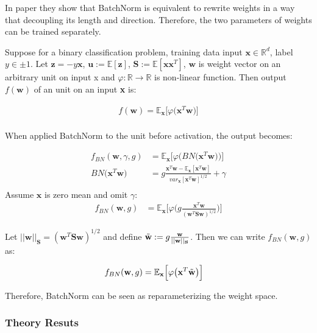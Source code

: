 \documentclass{article}
\begin{document}
In paper \cite{decoupling} they show that BatchNorm is equivalent to rewrite weights in a way that decoupling its length and direction. Therefore, the two parameters of weights can be trained separately.

Suppose for a binary classification problem, training data input $\textbf{x}\in\mathbb{R}^d$, label $y\in{\pm1}$. Let $\textbf{z}=-y\textbf{x}$, $\textbf{u}:=\mathbb{E}[\textbf{z}]$, $\textbf{S}:=\mathbb{E}[\textbf{xx}^T]$, $\textbf{w}$ is weight vector on an arbitrary unit on input x and $\varphi: \mathbb{R}\xrightarrow{}\mathbb{R}$ is non-linear function. Then output $f(\textbf{w})$ of an unit on an input \textbf{x} is:

\begin{align*}
	f(\textbf{w})=\mathbb{E}_{\textbf{x}}\big[\varphi\big(\textbf{x}^T\textbf{w}\big)\big]\\
\end{align*}

When applied BatchNorm to the unit before activation, the output becomes:

\begin{align*}
	f_{BN}(\textbf{w},\gamma,g)&=\mathbb{E}_{\textbf{x}}\big[\varphi\big(BN\big(\textbf{x}^T\textbf{w}\big)\big)\big]\\
	BN\big(\textbf{x}^T\textbf{w}\big)&=g\frac{\textbf{x}^T\textbf{w}-\mathbb{E}_{\textbf{x}}[\textbf{x}^T\textbf{w}]}{var_\textbf{x}[\textbf{x}^T\textbf{w}]^{1/2}}+\gamma\\
\end{align*}
Assume $\textbf{x}$ is zero mean and omit $\gamma$:
\begin{align*}
	f_{BN}(\textbf{w},g)&=\mathbb{E}_{\textbf{x}}\Big[\varphi\Big(g\frac{\textbf{x}^T\textbf{w}}{(\textbf{w}^T\textbf{Sw})^{1/2}}\Big)\Big]
\end{align*}

Let $||\textbf{w}||_{\textbf{S}}=(\textbf{w}^T\textbf{Sw})^{1/2}$ and define $\Tilde{\textbf{w}}:=g\frac{\textbf{w}}{||\textbf{w}||_{\textbf{S}}}$. Then we can write  $f_{BN}(\textbf{w},g)$ as:

\begin{align*}
    f_{BN}(\textbf{w},g)&=\mathbb{E}_{\textbf{x}}\Big[\varphi\big(\textbf{x}^T\Tilde{\textbf{w}}\big)\Big]
\end{align*}

Therefore, BatchNorm can be seen as reparameterizing the weight space.

\subsubsection{Theory Resuts}
\end{document}
